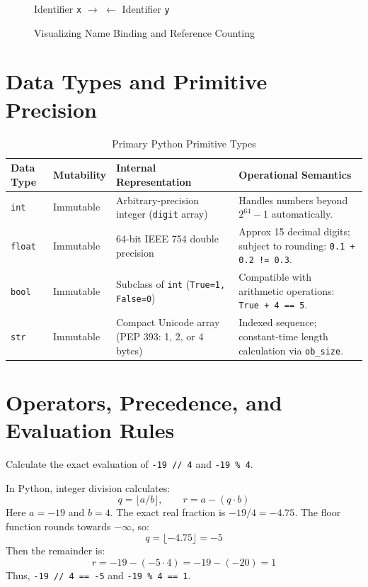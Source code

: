 \begin{figure}[htbp]
\centering
\begin{tcolorbox}[colback=boxgraybg,colframe=boxgrayborder,title={CPython Heap Reference Binding}]
\small
Identifier \texttt{x} $\longrightarrow$  $\longleftarrow$ Identifier \texttt{y}
\end{tcolorbox}
\caption{Visualizing Name Binding and Reference Counting}
\end{figure}

\section{Data Types and Primitive Precision}
\begin{table}[htbp]
\centering
\small
\begin{tabularx}{\linewidth}{lllX}
\toprule
\textbf{Data Type} & \textbf{Mutability} & \textbf{Internal Representation} & \textbf{Operational Semantics} \\
\midrule
\texttt{int} & Immutable & Arbitrary-precision integer (\texttt{digit} array) & Handles numbers beyond $2^{64}-1$ automatically. \\
\texttt{float} & Immutable & 64-bit IEEE 754 double precision & Approx 15 decimal digits; subject to rounding: \texttt{0.1 + 0.2 != 0.3}. \\
\texttt{bool} & Immutable & Subclass of \texttt{int} (\texttt{True=1, False=0}) & Compatible with arithmetic operations: \texttt{True + 4 == 5}. \\
\texttt{str} & Immutable & Compact Unicode array (PEP 393: 1, 2, or 4 bytes) & Indexed sequence; constant-time length calculation via \texttt{ob\_size}. \\
\bottomrule
\end{tabularx}
\caption{Primary Python Primitive Types}
\end{table}

\section{Operators, Precedence, and Evaluation Rules}
\begin{example}
Calculate the exact evaluation of \texttt{-19 // 4} and \texttt{-19 \% 4}.
\end{example}
\begin{solutionbox}
In Python, integer division calculates:
\begin{equation}
q = \lfloor a / b \rfloor, \qquad r = a - (q \cdot b)
\end{equation}
Here $a = -19$ and $b = 4$. The exact real fraction is $-19 / 4 = -4.75$.
The floor function rounds towards $-\infty$, so:
\begin{equation}
q = \lfloor -4.75 \rfloor = -5
\end{equation}
Then the remainder is:
\begin{equation}
r = -19 - (-5 \cdot 4) = -19 - (-20) = 1
\end{equation}
Thus, \texttt{-19 // 4 == -5} and \texttt{-19 \% 4 == 1}.
\end{solutionbox}

